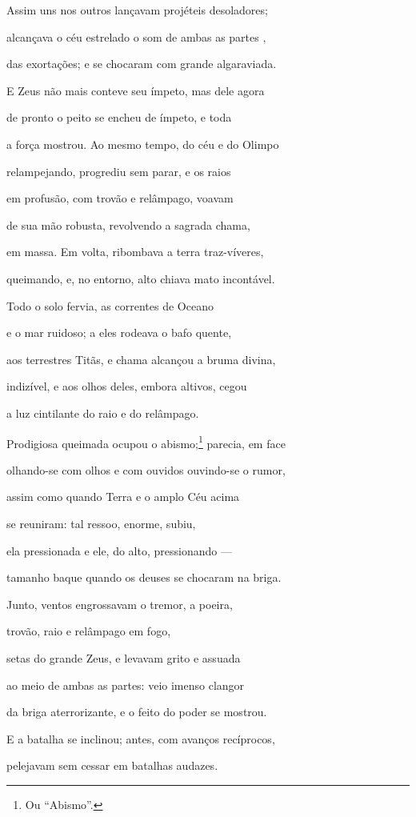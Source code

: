 \begin{pages}
\begin{Rightside}
Assim uns nos outros lançavam projéteis desoladores;

alcançava o céu estrelado o som de ambas as partes , 

das exortações; e se chocaram com grande algaraviada.

\quad{}E Zeus não mais conteve seu ímpeto, mas dele agora

de pronto o peito se encheu de ímpeto, e toda

a força mostrou. Ao mesmo tempo, do céu e do Olimpo

relampejando, progrediu sem parar, e os raios 

em profusão, com trovão e relâmpago, voavam

de sua mão robusta, revolvendo a sagrada chama,

em massa. Em volta, ribombava a terra traz-víveres,

queimando, e, no entorno, alto chiava mato incontável.

Todo o solo fervia, as correntes de Oceano 

e o mar ruidoso; a eles rodeava o bafo quente,

aos terrestres Titãs, e chama alcançou a bruma divina,

indizível, e aos olhos deles, embora altivos, cegou

a luz cintilante do raio e do relâmpago.

Prodigiosa queimada ocupou o abismo;\footnote{Ou ``Abismo''.} parecia, em face 

olhando-se com olhos e com ouvidos ouvindo-se o rumor,

assim como quando Terra e o amplo Céu acima

se reuniram: tal ressoo, enorme, subiu,

ela pressionada e ele, do alto, pressionando ---

tamanho baque quando os deuses se chocaram na briga. 

Junto, ventos engrossavam o tremor, a poeira,

trovão, raio e relâmpago em fogo,

setas do grande Zeus, e levavam grito e assuada

ao meio de ambas as partes: veio imenso clangor

da briga aterrorizante, e o feito do poder se mostrou. 

\quad{}E a batalha se inclinou; antes, com avanços recíprocos,

pelejavam sem cessar em batalhas audazes.


\end{Rightside}
\end{pages}
